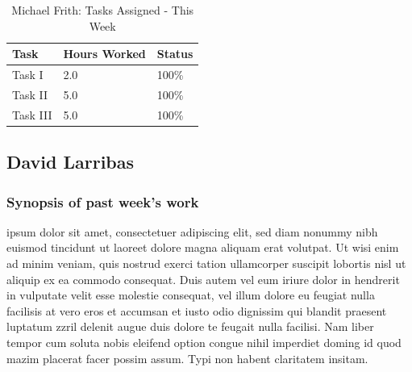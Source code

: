 \documentclass[12pt,journal]{IEEEtran}
\begin{document}
	\begin{table}[H]
	\renewcommand{\arraystretch}{1.3}
		\caption{Michael Frith: Tasks Assigned - This Week}
		
		\label{Summary of Michael Frith's activities: this week}
		
		\centering
		\begin{tabular}{p{5cm}|p{1cm}|p{1cm}}
		\hline
		\bfseries 	Task		 														& \bfseries Hours Worked	& \bfseries Status	\\
		\hline\hline
					      Task I 					 	            			& 2.0                   	& 100\%             \\
                Task II 														& 5.0                   	& 100\%             \\
                Task III														& 5.0                   	& 100\%             \\
		\hline
		\end{tabular}
	\end{table}

\subsection{David Larribas}

	\subsubsection*{Synopsis of past week's work}
	ipsum dolor sit amet, consectetuer adipiscing elit, sed diam nonummy nibh 
	euismod tincidunt ut laoreet dolore magna aliquam erat volutpat. Ut wisi enim ad minim veniam, quis 
	nostrud exerci tation ullamcorper suscipit lobortis nisl ut aliquip ex ea commodo consequat. Duis 
	autem vel eum iriure dolor in hendrerit in vulputate velit esse molestie consequat, vel illum dolore 
	eu feugiat nulla facilisis at vero eros et accumsan et iusto odio dignissim qui blandit praesent luptatum 
	zzril delenit augue duis dolore te feugait nulla facilisi. Nam liber tempor cum soluta nobis eleifend option 
	congue nihil imperdiet doming id quod mazim placerat facer possim assum. Typi non habent claritatem insitam.
\end{document}
